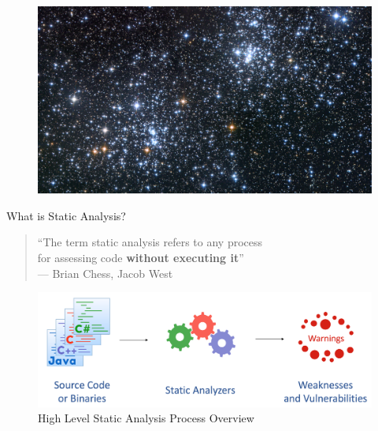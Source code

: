 \documentclass[aspectratio=169]{beamer}
\newenvironment{changemargin}[2]{%
\begin{list}{}{%
\setlength{\topsep}{0pt}%
\setlength{\leftmargin}{#1}%
\setlength{\rightmargin}{#2}%
\setlength{\listparindent}{\parindent}%
\setlength{\itemindent}{\parindent}%
\setlength{\parsep}{\parskip}%
}%
\item[]}{\end{list}}
\begin{document}
  \begin{frame}[standout]
    \begin{changemargin}{-2cm}{-2cm}
    \vspace{-0.2cm}
    \begin{figure}
      \centering
      \includegraphics[scale=0.24]{figures/universe}
    \end{figure}
    \end{changemargin}
  \end{frame}

  \begin{frame}{What is Static Analysis?}
    \begin{quote}
      \begin{flushright}
        ``The term \alert{static analysis} refers to any process\\ for assessing code \textbf{without executing it}''\\
        --- Brian Chess, Jacob West
      \end{flushright}
    \end{quote}
    \pause
    \begin{figure}
      \centering
      \includegraphics[scale=0.35]{figures/static-analysis}
      \caption{High Level Static Analysis Process Overview}
    \end{figure}
  \end{frame}
\end{document}
